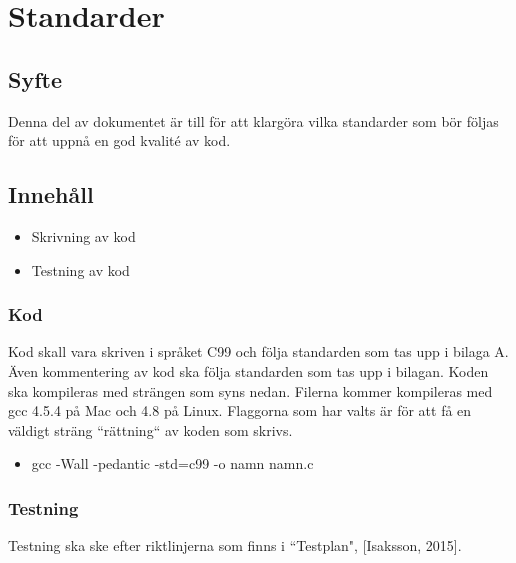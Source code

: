 \section{Standarder}

\subsection{Syfte}
Denna del av dokumentet är till för att klargöra vilka standarder som bör följas för att uppnå en god kvalité av kod.

\subsection{Innehåll}
\begin{itemize}
\item Skrivning av kod
\item Testning av kod
\end{itemize}

\subsubsection{Kod}
Kod skall vara skriven i språket C99 och följa standarden som tas upp i bilaga A. Även kommentering av kod ska följa standarden som tas upp i bilagan. 
\newline
\newline
Koden ska kompileras med strängen som syns nedan. Filerna kommer kompileras med gcc 4.5.4 på Mac och 4.8 på Linux. Flaggorna som har valts är för att få en väldigt sträng ``rättning`` av koden som skrivs. 

\begin{itemize}
\item gcc -Wall -pedantic -std=c99 -o namn namn.c
\end{itemize}

\subsubsection{Testning}
Testning ska ske efter riktlinjerna som finns i ``Testplan", [Isaksson, 2015]. 
